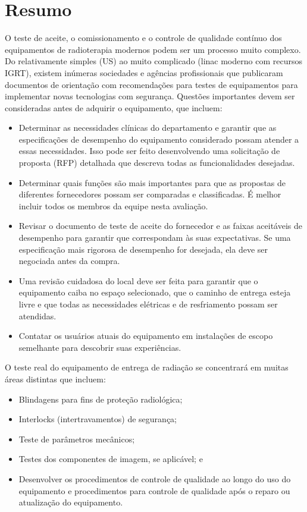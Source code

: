 \documentclass[11pt,a4paper]{article}
\begin{document}
\section{Resumo}

	O teste de aceite, o comissionamento e o controle de qualidade contínuo dos equipamentos de radioterapia modernos podem ser um processo muito complexo. Do relativamente simples (US) ao muito complicado (linac moderno com recursos IGRT), existem inúmeras sociedades e agências profissionais que publicaram documentos de orientação com recomendações para testes de equipamentos para implementar novas tecnologias com segurança. Questões importantes devem ser consideradas antes de adquirir o equipamento, que incluem:

	\begin{itemize}[label=\textcolor{CarnationPink}{$\blacktriangleright$}]
		\item Determinar as necessidades clínicas do departamento e garantir que as especificações de desempenho do equipamento considerado possam atender a essas necessidades. Isso pode ser feito desenvolvendo uma solicitação de proposta (RFP) detalhada que descreva todas as funcionalidades desejadas.
		\item Determinar quais funções são mais importantes para que as propostas de diferentes fornecedores possam ser comparadas e classificadas. É melhor incluir todos os membros da equipe nesta avaliação.
		\item Revisar o documento de teste de aceite do fornecedor e as faixas aceitáveis de desempenho para garantir que correspondam às suas expectativas. Se uma especificação mais rigorosa de desempenho for desejada, ela deve ser negociada antes da compra.
		\item Uma revisão cuidadosa do local deve ser feita para garantir que o equipamento caiba no espaço selecionado, que o caminho de entrega esteja livre e que todas as necessidades elétricas e de resfriamento possam ser atendidas.
		\item Contatar os usuários atuais do equipamento em instalações de escopo semelhante para descobrir suas experiências.
	\end{itemize}

	O teste real do equipamento de entrega de radiação se concentrará em muitas áreas distintas que incluem:

	\begin{itemize}[label=\textcolor{CarnationPink}{$\blacktriangleright$}]
		\item Blindagens para fins de proteção radiológica;
		\item Interlocks (intertravamentos) de segurança;
		\item Teste de parâmetros mecânicos;
		\item Testes dos componentes de imagem, se aplicável; e
		\item Desenvolver os procedimentos de controle de qualidade ao longo do uso do equipamento e procedimentos para controle de qualidade após o reparo ou atualização do equipamento.
	\end{itemize}
\end{document}
